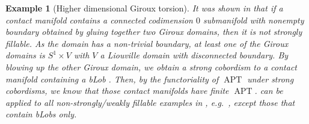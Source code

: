 \documentclass[11pt]{amsart}
\numberwithin{equation}{section}
\newtheorem{proposition}[theorem]{\textbf{Proposition}}
\newtheorem{example}[theorem]{\textbf{Example}}
\def\D{{\mathbb D}}
\DeclareMathOperator{\APT}{APT}
\begin{document}

\begin{example}[Higher dimensional Giroux torsion]
It was shown in \cite[Theorem B]{MNW} that if a contact manifold contains a connected codimension $0$ submanifold with nonempty boundary obtained by gluing together two Giroux domains, then it is not strongly fillable. As the domain has a non-trivial boundary, at least one of the Giroux domains is $S^1\times V$ with $V$ a Liouville domain with disconnected boundary. By blowing up the other Giroux domain, we obtain a strong cobordism to a contact manifold containing a bLob \cite[Proposition 4.9]{MNW}. Then, by the functoriality of $\APT$ under strong cobordisms, we know that those contact manifolds have finite $\APT$. \cite[Theorem B]{MNW} can be applied to all non-strongly/weakly fillable examples in \cite{MNW}, e.g.\ \cite[Theorems A, E, F and G]{MNW},  except those that contain bLobs only.


\end{example}
\end{document}
